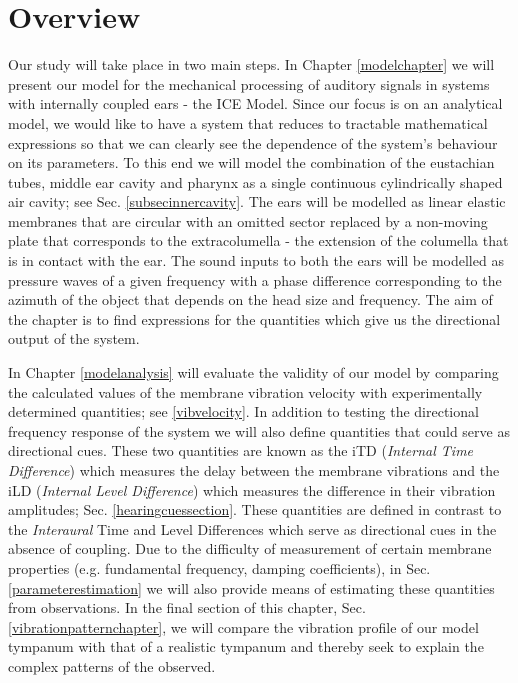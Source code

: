 \section{Overview}
Our study will take place in two main steps. In Chapter \ref{modelchapter} we will
present our model for the mechanical processing of auditory signals in systems with internally coupled ears - the ICE Model.
Since our focus is on an analytical model, we would like to have a system that reduces to tractable mathematical expressions
so that we can clearly see the dependence of the system's behaviour on its parameters. To this end we will model the 
combination of the eustachian tubes, middle ear cavity and pharynx as a single continuous cylindrically shaped air cavity; see
Sec. \ref{subsecinnercavity}. The ears will be modelled as linear elastic membranes that are circular with an omitted sector replaced
by a non-moving plate
that corresponds to the extracolumella - the extension of the columella that is in contact with the ear. The
sound inputs to both the ears will be modelled as pressure waves of a given frequency with a phase difference corresponding to the azimuth of the object that depends on the 
head size and frequency. The aim of the chapter is to find expressions for the quantities which give us the directional output of the system.

In Chapter \ref{modelanalysis} will evaluate the validity of our model
by comparing the calculated values of the membrane vibration velocity with experimentally determined quantities; 
see \ref{vibvelocity}. In addition to testing the directional frequency
response of the system we will also define quantities that could serve as directional cues. These two quantities are known
as the iTD (\emph{Internal Time Difference}) which measures the delay between the membrane vibrations and the iLD (\emph{Internal Level
Difference}) which measures the difference in their vibration amplitudes; Sec. \ref{hearingcuessection}. These quantities are defined in contrast to the
\emph{Interaural} Time and Level  Differences which serve as directional cues in the absence of coupling. Due to the difficulty of measurement of certain membrane
properties (e.g. fundamental frequency, damping coefficients), in Sec. \ref{parameterestimation} we will also provide means of estimating these quantities from observations.
In the final section of this chapter, Sec. \ref{vibrationpatternchapter}, we will compare the vibration profile of our model tympanum with that of a realistic tympanum and thereby
seek to explain the complex patterns of the observed.
